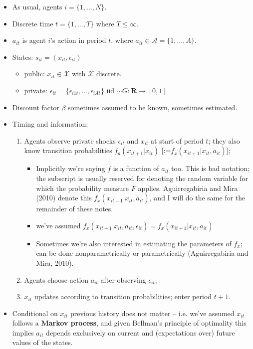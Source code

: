 \documentclass[11pt]{article}
\begin{document}
	\begin{itemize}
		\item As usual, agents $i = \{1,\dots,N\}$.
		\item Discrete time $t = \{1,\dots,T\}$ where $T\leq \infty$.
		\item $a_{it}$ is agent $i$'s action in period $t$, where $a_{it}\in \mathcal{A} = \{1,\dots, A\}$.
		\item States: $s_{it}=(x_{it},\epsilon_{it})$
		\begin{itemize}
			\item public: $x_{it}\in \mathcal{X}$ with $\mathcal{X}$ discrete.
			\item private: $\epsilon_{it}=\{\epsilon_{i1t},\dots,\epsilon_{iAt}\}$ iid $\sim G:\mathbf{R}\rightarrow[0,1]$
		\end{itemize}
		\item Discount factor $\beta$ sometimes assumed to be known, sometimes estimated.
    \item Timing and information:
		\begin{enumerate}
			\item Agents observe private shocks $\epsilon_{it}$ and $x_{it}$ at start of period $t$; they also know transition probabilities $f_a(x_{it+1}|x_{it})$ [:=$f_x(x_{it+1}|x_{it},a_{it})$];
      			\begin{itemize}
      				\item Implicitly we're saying $f$ is a function of $a_{it}$ too. This is bad notation; the subscript is usually reserved for denoting the random variable for which the probability measure $F$ applies. Aguirregabiria and Mira (2010) denote this $f_x(x_{it+1}|x_{it},a_{it})$, and I will do the same for the remainder of these notes.
      				\item we've assumed $f_x(x_{it+1}|x_{it},a_{it}, \epsilon_{it})=f_x(x_{it+1}|x_{it},a_{it})$
      				\item Sometimes we're also interested in estimating the parameters of $f_x$; can be done nonparametrically or parametrically  (Aguirregabiria and Mira, 2010).
      			\end{itemize}
			\item Agents choose action $a_{it}$ after observing $\epsilon_{it}$;
      \item $x_{it}$ updates according to transition probabilities; enter period $t+1$.
		\end{enumerate}
		\item Conditional on $x_{it}$ previous history does not matter -- i.e. we've assumed $x_{it}$ follows a \textbf{Markov process}, and given Bellman's principle of optimality this implies $a_{it}$ depends exclusively on current and (expectations over) future values of the states.
	\end{itemize}
\end{document}
